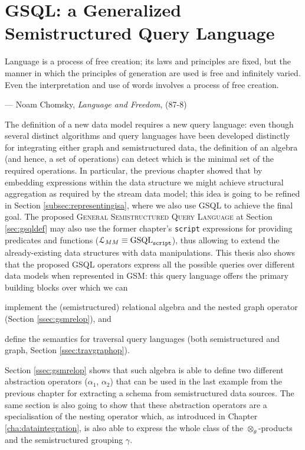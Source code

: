 \chapter{GSQL: a Generalized Semistructured Query Language}\label{cha:NGQL}
\epigraph{Language is a process of free creation; its laws and principles are fixed, but the manner in which the principles of generation are used is free and infinitely varied. Even the interpretation and use of words involves a process of free creation.}{--- Noam Chomsky, \textit{Language and Freedom}, (87-8)}


The definition of a new data model requires a new query language: even though several distinct algorithms and query languages have been developed distinctly for integrating either graph and semistructured data, the definition of an algebra (and hence, a set of operations) can detect which is the minimal set of the required operations. In particular, the previous chapter showed that by embedding expressions within the data structure we might achieve structural aggregation as required by the stream data model; this idea is going to be refined in Section \ref{subsec:representingisa}, where we also use GSQL to achieve the final goal. The proposed \textsc{General Semistructured Query Language} at Section \ref{sec:gsqldef} may also use the former chapter's \texttt{script} expressions for providing predicates and functions ($\langg_{\metamodel}\equiv \textup{GSQL}_{\texttt{script}}$), thus  allowing to extend the already-existing data structures with data manipulations.  This thesis also shows that the proposed GSQL operators express all the possible queries over different data models when represented in GSM:  this query language offers the primary building blocks over which we can \begin{mylist}
	\item implement the (semistructured) relational algebra and the nested graph operator (Section \vref{ssec:gsmrelop}), and
	\item define the semantics for traversal query languages (both semistructured and graph, Section \vref{ssec:travgraphop}).
\end{mylist} Section \vref{ssec:gsmrelop} shows that such algebra is able to define two different abstraction operators ($\alpha_1$, $\alpha_2$) that can be used in the last example from the previous chapter for extracting a schema from semistructured data sources. The same section is also going to show that these abstraction operators are a specialisation of the nesting operator which, as introduced in Chapter \ref{cha:dataintegration}, is also able to express the whole class of the $\otimes_\theta$-products and the semistructured grouping $\gamma$.



